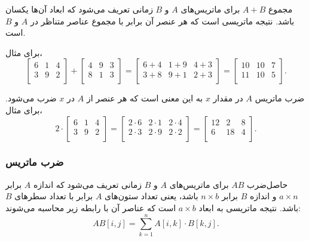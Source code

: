 مجموع $A+B$ برای ماتریس‌های $A$ و $B$
زمانی تعریف می‌شود که ابعاد آن‌ها یکسان باشد.
نتیجه ماتریسی است که هر عنصر آن
برابر با مجموع عناصر متناظر
در $A$ و $B$ است.

برای مثال،
\[
 \begin{bmatrix}
  6 & 1 & 4 \\
  3 & 9 & 2 \\
 \end{bmatrix}
+
 \begin{bmatrix}
  4 & 9 & 3 \\
  8 & 1 & 3 \\
 \end{bmatrix}
=
 \begin{bmatrix}
  6+4 & 1+9 & 4+3 \\
  3+8 & 9+1 & 2+3 \\
 \end{bmatrix}
=
 \begin{bmatrix}
  10 & 10 & 7 \\
  11 & 10 & 5 \\
 \end{bmatrix}.
\]

ضرب ماتریس $A$ در مقدار $x$ به این معنی است
که هر عنصر از $A$ در $x$ ضرب می‌شود.
برای مثال،
\[
 2 \cdot \begin{bmatrix}
  6 & 1 & 4 \\
  3 & 9 & 2 \\
 \end{bmatrix}
=
 \begin{bmatrix}
  2 \cdot 6 & 2\cdot1 & 2\cdot4 \\
  2\cdot3 & 2\cdot9 & 2\cdot2 \\
 \end{bmatrix}
=
 \begin{bmatrix}
  12 & 2 & 8 \\
  6 & 18 & 4 \\
 \end{bmatrix}.
\]

\subsubsection{ضرب ماتریس}


حاصل‌ضرب $AB$ برای ماتریس‌های $A$ و $B$
زمانی تعریف می‌شود که اندازه $A$ برابر $a \times n$
و اندازه $B$ برابر $n \times b$ باشد، یعنی
تعداد ستون‌های $A$ برابر با تعداد سطرهای $B$ باشد.
نتیجه ماتریسی به ابعاد $a \times b$ است
که عناصر آن با رابطه زیر محاسبه می‌شوند:
\[
AB[i,j] = \sum_{k=1}^n A[i,k] \cdot B[k,j].
\]

